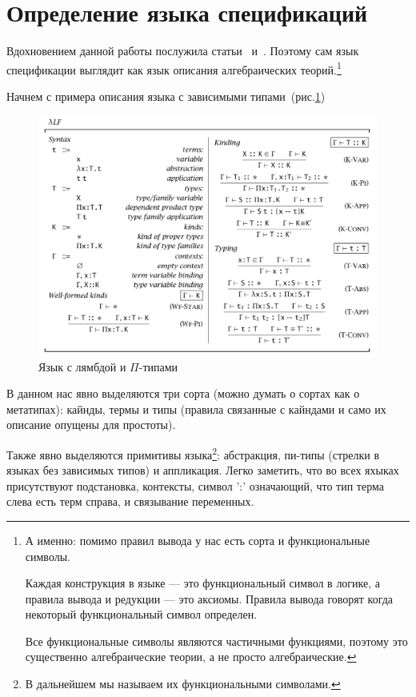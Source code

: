 \section{Определение языка спецификаций}\label{lang_spec}

Вдохновением данной работы послужила статьи~\cite{Palmgren} и~\cite{isaev}. Поэтому сам язык спецификации выглядит как язык описания алгебраических теорий.\footnote{А именно: помимо правил вывода у нас есть сорта и функциональные символы.

Каждая конструкция в языке --- это функциональный символ в логике, а правила вывода и редукции --- это аксиомы.
Правила вывода говорят когда некоторый функциональный символ определен.

Все функциональные символы являются частичными функциями, поэтому это существенно алгебраические теории, а не просто алгебраические.}

Начнем с примера описания языка с зависимыми типами~(рис.\ref{lpi})~\cite[Глава~2.1]{book:pierce}

\begin{figure}
    \centering
	\includegraphics[scale=0.35]{img/lp.png}
	\caption{Язык с лямбдой и $\Pi$-типами }
	\label{lpi}
\end{figure}

В данном нас явно выделяются три сорта (можно думать о сортах как о метатипах): кайнды, термы и типы (правила связанные с кайндами и само их описание опущены для простоты).

Также явно выделяются примитивы языка\footnote{В дальнейшем мы называем их функциональными символами.}:
абстракция, пи-типы (стрелки в языках без зависимых типов) и аппликация. Легко заметить, что во всех яхыках присутствуют подстановка, контексты, символ ':' означающий, что тип терма слева есть терм справа, и связывание переменных.

